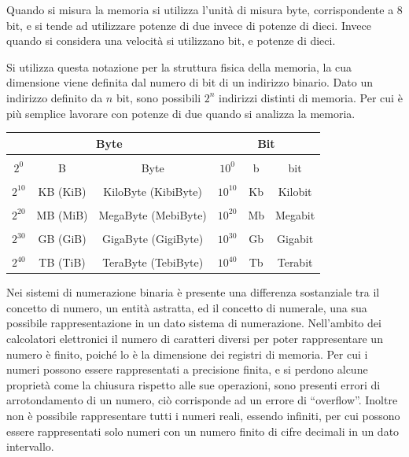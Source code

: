 \documentclass{article}
\numberwithin{equation}{subsection}
\begin{document}
Quando si misura la memoria si utilizza l'unità di misura byte, corrispondente a 8 bit, e si tende ad utilizzare potenze di due invece di potenze di dieci. Invece quando si considera una velocità 
si utilizzano bit, e potenze di dieci.  

Si utilizza questa notazione per la struttura fisica della memoria, la cua dimensione viene definita dal numero di bit di un indirizzo binario. Dato un indirizzo definito da 
$n$ bit, sono possibili $2^n$ indirizzi distinti di memoria. Per cui è più semplice lavorare con potenze di due quando si analizza la memoria. 

\begin{center}
    \begin{tabular}{|c|c|c||c|c|c|}
        \multicolumn{3}{c}{Byte}&\multicolumn{3}{c}{Bit}\\
        \hline&&&&& \\[-1em]
        $2^0$ & B & Byte&$10^0$& b& bit\\
        \hline &&&&& \\[-1em]
        $2^{10}$ & KB (KiB) & KiloByte (KibiByte)&$10^{10}$& Kb& Kilobit\\
        \hline  &&&&& \\[-1em]
        $2^{20}$ & MB (MiB)& MegaByte (MebiByte)&$10^{20}$& Mb& Megabit\\
        \hline  &&&&& \\[-1em]
        $2^{30}$ & GB (GiB) & GigaByte (GigiByte)&$10^{30}$& Gb& Gigabit\\
        \hline  &&&&& \\[-1em]
        $2^{40}$ & TB (TiB) & TeraByte (TebiByte)&$10^{40}$& Tb& Terabit\\
        \hline 

    \end{tabular}
\end{center}

Nei sistemi di numerazione binaria è presente una differenza sostanziale tra il concetto di numero, un entità astratta, ed il concetto di numerale, 
una sua possibile rappresentazione in un dato sistema di numerazione. 
Nell'ambito dei calcolatori elettronici il numero di caratteri diversi per poter rappresentare un numero è finito, poiché lo è la dimensione dei registri di memoria. Per cui 
i numeri possono essere rappresentati a precisione finita, e si perdono alcune proprietà come la chiusura rispetto alle sue operazioni, sono presenti errori di arrotondamento di 
un numero, ciò corrisponde ad un errore di ``overflow''. Inoltre non è possibile rappresentare tutti i numeri reali, essendo infiniti, per cui possono essere rappresentati solo 
numeri con un numero finito di cifre decimali in un dato intervallo. 
\end{document}
